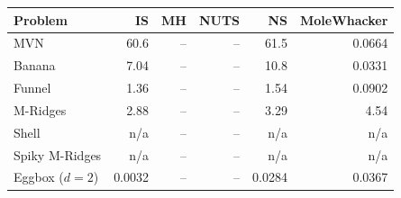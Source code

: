 \begin{tabular}{lrrrrr}
\toprule
Problem & IS & MH & NUTS & NS & MoleWhacker \\
\midrule
MVN & 60.6 & -- & -- & 61.5 & 0.0664 \\
Banana & 7.04 & -- & -- & 10.8 & 0.0331 \\
Funnel & 1.36 & -- & -- & 1.54 & 0.0902 \\
M-Ridges & 2.88 & -- & -- & 3.29 & 4.54 \\
Shell & n/a & -- & -- & n/a & n/a \\
Spiky M-Ridges & n/a & -- & -- & n/a & n/a \\
\midrule
Eggbox ($d=2$) & 0.0032 & -- & -- & 0.0284 & 0.0367 \\
\bottomrule
\end{tabular}
